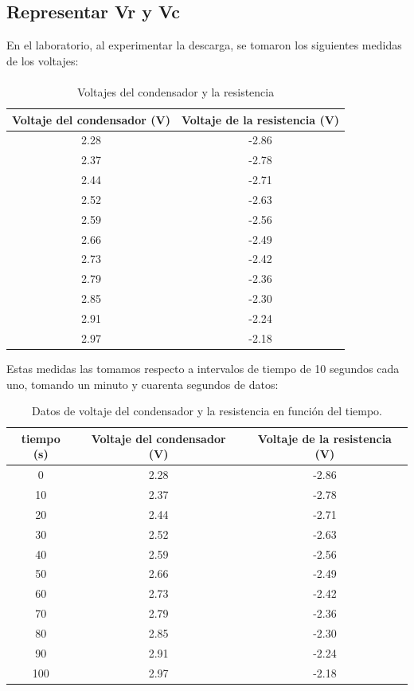 \documentclass{article}
\begin{document}
\subsection{Representar Vr y Vc}
En el laboratorio, al experimentar la descarga, se tomaron los siguientes medidas de los voltajes: 

\paragraph{}
\begin{table}[H]
    \centering
    \begin{tabular}{cc}
        \toprule
        \textbf{Voltaje del condensador (V)} & \textbf{Voltaje de la resistencia (V)} \\
        \midrule
        2.28 & -2.86 \\
        2.37 & -2.78 \\
        2.44 & -2.71 \\
        2.52 & -2.63 \\
        2.59 & -2.56 \\
        2.66 & -2.49 \\
        2.73 & -2.42 \\
        2.79 & -2.36 \\
        2.85 & -2.30 \\
        2.91 & -2.24 \\
        2.97 & -2.18 \\
        \bottomrule
    \end{tabular}
    \caption{Voltajes del condensador y la resistencia}
    \label{tab:voltajes}
\end{table}

Estas medidas las tomamos respecto a intervalos de tiempo de 10 segundos cada uno, tomando un minuto y cuarenta segundos de datos:

\begin{table}[H]
    \centering
    \begin{tabular}{ccc}
        \hline
        tiempo (s) & Voltaje del condensador (V) & Voltaje de la resistencia (V) \\
        \hline
        0   & 2.28 & -2.86 \\
        10  & 2.37 & -2.78 \\
        20  & 2.44 & -2.71 \\
        30  & 2.52 & -2.63 \\
        40  & 2.59 & -2.56 \\
        50  & 2.66 & -2.49 \\
        60  & 2.73 & -2.42 \\
        70  & 2.79 & -2.36 \\
        80  & 2.85 & -2.30 \\
        90  & 2.91 & -2.24 \\
        100 & 2.97 & -2.18 \\
        \hline
    \end{tabular}
    \caption{Datos de voltaje del condensador y la resistencia en función del tiempo.}
    \label{tab:voltajes}
\end{table}
\end{document}
